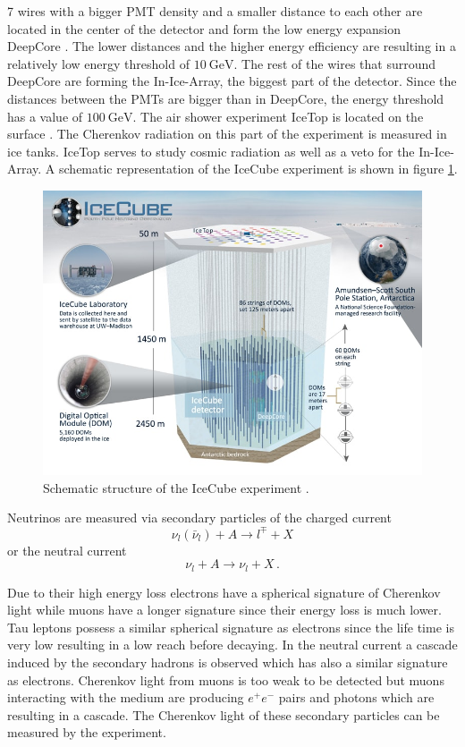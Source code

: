 7 wires with a bigger PMT density and a smaller distance to each other are located in the center of the detector and form the low energy expansion DeepCore \cite{DeepCore}.
The lower distances and the higher energy efficiency are resulting in a relatively low energy threshold of $\SI{10}{\giga\electronvolt}$.
The rest of the wires that surround DeepCore are forming the In-Ice-Array, the biggest part of the detector.
Since the distances between the PMTs are bigger than in DeepCore, the energy threshold has a value of $\SI{100}{\giga\electronvolt}$.
The air shower experiment IceTop is located on the surface \cite{IceTop}.
The Cherenkov radiation on this part of the experiment is measured in ice tanks.
IceTop serves to study cosmic radiation as well as a veto for the In-Ice-Array.
A schematic representation of the IceCube experiment is shown in figure \ref{fig:cube}.

\begin{figure}
  \centering
  \includegraphics[width=1\textwidth]{graphics/IceCube.jpg}
  \caption{Schematic structure of the IceCube experiment \cite{IceCube}.}
  \label{fig:cube}
\end{figure}

Neutrinos are measured via secondary particles of the charged current
\begin{equation*}
  \nu_l (\bar{\nu}_l) + A \to l^{\mp} + X
\end{equation*}
or the neutral current
\begin{equation*}
  \nu_l + A \to \nu_l + X\,.
\end{equation*}

Due to their high energy loss electrons have a spherical signature of Cherenkov light while muons have a longer signature since their energy loss is much lower.
Tau leptons possess a similar spherical signature as electrons since the life time is very low resulting in a low reach before decaying.
In the neutral current a cascade induced by the secondary hadrons is observed which has also a similar signature as electrons.
Cherenkov light from muons is too weak to be detected but muons interacting with the medium are producing $e^+e^-$ pairs and photons which are resulting in a cascade.
The Cherenkov light of these secondary particles can be measured by the experiment.

